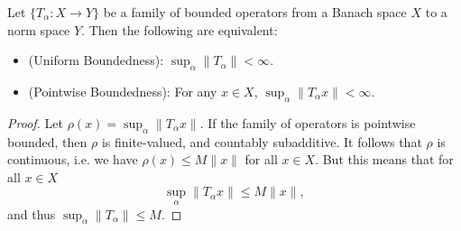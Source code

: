 \begin{theorem}
    Let $\{ T_\alpha: X \to Y \}$ be a family of bounded operators from a Banach space $X$ to a norm space $Y$. Then the following are equivalent:
    \begin{itemize}
        \item (Uniform Boundedness): $\sup_\alpha \| T_\alpha \| < \infty$.
        \item (Pointwise Boundedness): For any $x \in X$, $\sup_\alpha \| T_\alpha x \| < \infty$.
    \end{itemize}
\end{theorem}
\begin{proof}
    Let $\rho(x) = \sup_\alpha \| T_\alpha x \|$. If the family of operators is pointwise bounded, then $\rho$ is finite-valued, and countably subadditive. It follows that $\rho$ is continuous, i.e. we have $\rho(x) \leq M \| x \|$ for all $x \in X$. But this means that for all $x \in X$
    \[ \sup_\alpha \| T_\alpha x \| \leq M \| x \|, \]
    and thus $\sup_\alpha \| T_\alpha \| \leq M$.
\end{proof}

